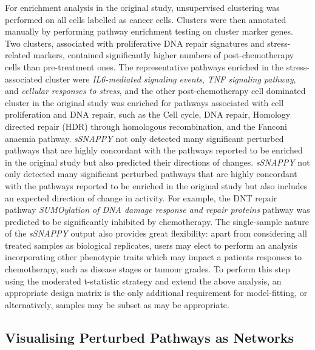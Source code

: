 \documentclass[9pt,a4paper,]{extarticle}
\begin{document}
For enrichment analysis in the original study\citep{Zhang2022}, unsupervised clustering was performed on all cells labelled as cancer cells.
Clusters were then annotated manually by performing pathway enrichment testing on cluster marker genes.
Two clusters, associated with proliferative DNA repair signatures and stress-related markers, contained significantly higher numbers of post-chemotherapy cells than pre-treatment ones\citep{Zhang2022}.
The representative pathways enriched in the stress-associated cluster were \emph{IL6-mediated signaling events}, \emph{TNF signaling pathway}, and \emph{cellular responses to stress}, and the other post-chemotherapy cell dominated cluster in the original study was enriched for pathways associated with cell proliferation and DNA repair, such as the Cell cycle, DNA repair, Homology directed repair (HDR) through homologous recombination, and the Fanconi anaemia pathway.
\emph{sSNAPPY} not only detected many significant perturbed pathways that are highly concordant with the pathways reported to be enriched in the original study but also predicted their directions of changes.
\emph{sSNAPPY} not only detected many significant perturbed pathways that are highly concordant with the pathways reported to be enriched in the original study but also includes an expected direction of change in activity.
For example, the DNT repair pathway \emph{SUMOylation of DNA damage response and repair proteins} pathway was predicted to be significantly inhibited by chemotherapy.
The single-sample nature of the \emph{sSNAPPY} output also provides great flexibility: apart from considering all treated samples as biological replicates, users may elect to perform an analysis incorporating other phenotypic traits which may impact a patients responses to chemotherapy, such as disease stages or tumour grades.
To perform this step using the moderated t-statistic strategy and extend the above analysis, an appropriate design matrix is the only additional requirement for model-fitting, or alternatively, samples may be subset as may be appropriate.

\hypertarget{visualising-perturbed-pathways-as-networks}{%
\subsection{Visualising Perturbed Pathways as Networks}\label{visualising-perturbed-pathways-as-networks}}
\end{document}
